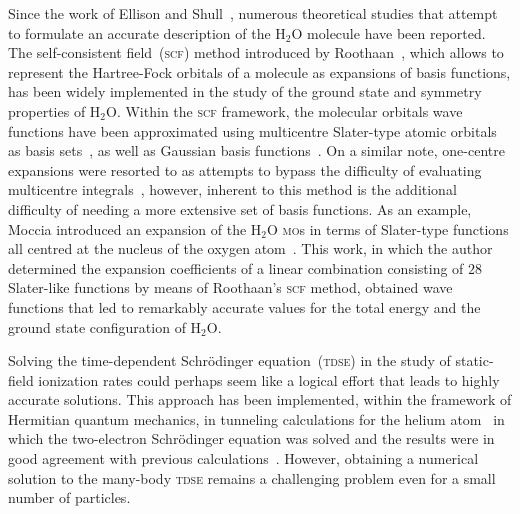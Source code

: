 

Since the work of Ellison and Shull~\cite{EllisonShullh2o_1955},
numerous theoretical studies that attempt to formulate an accurate
description of the H$_{2}$O molecule have been reported. The
self-consistent field~(\textsc{scf}) method introduced by
Roothaan~\cite{Roothaan_1951}, which allows to represent the
Hartree-Fock orbitals of a molecule as expansions of basis functions,
has been widely implemented in the study of the ground state and
symmetry properties of H$_{2}$O. Within the \textsc{scf} framework,
the molecular orbitals wave functions have been approximated using
multicentre Slater-type atomic orbitals as basis
sets~\cite{Reeves_nature_1956,natureH2O_1960,Pitzer_1968,Pitzer_1970},
as well as Gaussian basis
functions~\cite{gaussianH2O_1965,Neumann_gaussian_1968}. On a similar
note, one-centre expansions were resorted to as attempts to bypass the
difficulty of evaluating multicentre
integrals~\cite{Moccia_1964,oneCentre_1961,Parr_JCP_1960}, however,
inherent to this method is the additional difficulty of needing a more
extensive set of basis functions. As an example, Moccia introduced an
expansion of the H$_{2}$O \textsc{mo}s in terms of Slater-type
functions all centred at the nucleus of the oxygen
atom~\cite{Moccia_1964}. This work, in which the author determined the
expansion coefficients of a linear combination consisting of $28$
Slater-like functions by means of Roothaan's \textsc{scf} method,
obtained wave functions that led to remarkably accurate values for the
total energy and the ground state configuration of H$_{2}$O.


Solving the time-dependent Schr\"{o}dinger equation~(\textsc{tdse}) in
the study of static-field ionization rates could perhaps seem like a
logical effort that leads to highly accurate solutions. This approach
has been implemented, within the framework of Hermitian quantum
mechanics, in tunneling calculations for the helium
atom~\cite{static_tdse_He,static_tdse_He_method} in which the
two-electron Schr\"{o}dinger equation was solved and the results were
in good agreement with previous
calculations~\cite{static_He_scrinzi}. However, obtaining a numerical
solution to the many-body \textsc{tdse} remains a challenging problem
even for a small number of particles.

